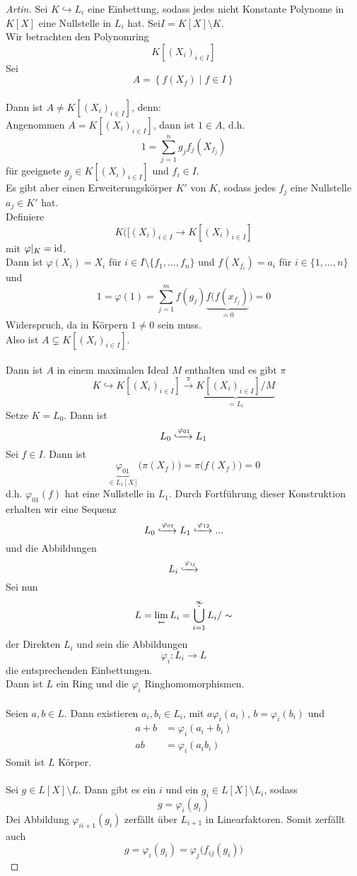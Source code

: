 	\begin{proof}[Artin]
		Sei $K\hookrightarrow L_i$ eine Einbettung, sodass jedes nicht Konstante Polynome in $K[X]$ eine Nullstelle in $L_i$ hat. Sei$I=K[X]\setminus K$.\\
		Wir betrachten den Polynomring
		\[K[(X_i)_{i\in I}]\]
		Sei
		\[A=\left\{f(X_f)\mid f\in I\right\}\]\\
		
		Dann ist $A\neq K[(X_i)_{i\in I}]$, denn:\\
		Angenommen $A=K[(X_i)_{i\in I}]$, dann ist $1\in A$, d.h.
		\[1=\sum_{j=1}^{n}g_jf_j(X_{f_j})\]
		für geeignete $g_j\in K[(X_i)_{i\in I}]$ und $f_i\in I$.\\
		Es gibt aber einen Erweiterungskörper $K'$ von $K$, sodass jedes $f_j$ eine Nullstelle $a_j\in K'$ hat.\\
		Definiere 
		\[K([(X_i)_{i\in I}\to K[(X_i)_{i\in I}]\]
		mit $\varphi|_K=\operatorname{id}$.\\
		Dann ist $\varphi(X_i)=X_i$ für $i\in I\setminus \{f_1,...,f_n\}$ und $f(X_{f_i})=a_i$ für $i\in\{1,...,n\}$ und
		\[1=\varphi(1)=\sum_{j=1}^{m}f(g_j)\underbrace{f\big(f(x_{f_j})}_{=0}\big)=0\]
		Widerspruch, da in Körpern $1\neq 0$ sein muss.\\
		Also ist $A\subsetneq K[(X_i)_{i\in I}]$.\\
		\\
		Dann ist $A$ in einem maximalen Ideal $M$ enthalten und es gibt $\pi$
		\[K\hookrightarrow K[(X_i)_{i\in I}]\xrightarrow{\pi}\underbrace{K[(X_i)_{i\in I}]/M}_{=L_i}\]
		Setze $K=L_0$. Dann ist
		\[L_0\xhookrightarrow{\varphi_{01}}L_1\]
		Sei $f\in I$. Dann ist
		\[\underbrace{\varphi_{01}}_{\in L_1[X]}\big(\pi(X_f)\big)=\pi\big(f(X_f)\big)=0\]
		d.h. $\varphi_{01}(f)$ hat eine Nullstelle in $L_1$. Durch Fortführung dieser Konstruktion erhalten wir eine Sequenz
		\[L_0\xhookrightarrow[]{\varphi_{01}}L_1\xhookrightarrow[]{\varphi_{12}}...\]
		und die Abbildungen
		\[L_i\xhookrightarrow[]{\varphi_{ij}}\]
		Sei nun
		\[L=\projlim{ }L_i=\operatornamewithlimits{\dot{\bigcup}}_{i=1}^\infty L_i/\sim\]
		der Direkten $L_i$ und sein die Abbildungen
		\[\varphi_i:L_i\to L\]
		die entsprechenden Einbettungen.\\
		Dann ist $L$ ein Ring und die $\varphi_i$ Ringhomomorphismen.\\
		\\
		Seien $a,b\in L$. Dann existieren $a_i,b_i\in L_i$, mit $a\varphi_i(a_i)$, $b=\varphi_i(b_i)$ und
		\begin{align*}
		a+b&=\varphi_i(a_i+b_i)\\
		ab&=\varphi_i(a_ib_i)
		\end{align*}
		Somit ist $L$ Körper.\\
		\\
		Sei $g\in L[X]\setminus L$. Dann gibt es ein $i$ und ein $g_i\in L[X]\setminus L_i$, sodass
		\[g=\varphi_i(g_i)\]
		Dei Abbildung $\varphi_{ii+1}(g_i)$ zerfällt über $L_{i+1}$ in Linearfaktoren. Somit zerfällt auch
		\[g=\varphi_i(g_i)=\varphi_{j}\big(f_{ij}(g_i)\big)\]
 	\end{proof}
 

